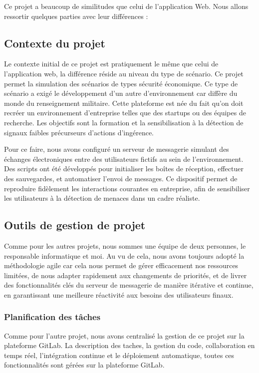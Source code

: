 Ce projet a beaucoup de similitudes que celui de l'application Web. Nous allons ressortir quelques parties avec leur différences :


\subsection{Contexte du projet}
Le contexte initial de ce projet est pratiquement le même que celui de l'application web, la différence réside au niveau du type de scénario.
Ce projet permet la simulation des scénarios de types sécurité économique.
Ce type de scénario a exigé le développement d'un autre d'environnement car diffère du monde du renseignement militaire.
Cette plateforme est née du fait qu'on doit recréer un environnement d’entreprise telles que des startups ou des équipes de recherche.
Les objectifs sont la formation et la sensibilisation à la détection de signaux faibles précurseurs d’actions d’ingérence.

Pour ce faire, nous avons configuré un serveur de messagerie simulant des échanges électroniques entre des utilisateurs fictifs au sein de l’environnement.
Des scripts ont été développés pour initialiser les boîtes de réception, effectuer des sauvegardes, et automatiser l’envoi de messages.
Ce dispositif permet de reproduire fidèlement les interactions courantes en entreprise, afin de sensibiliser les utilisateurs à la détection de menaces dans un cadre réaliste.

\subsection{Outils de gestion de projet}
Comme pour les autres projets, nous sommes une équipe de deux personnes, le responsable informatique et moi. Au vu de cela, nous avons toujours adopté la méthodologie agile car cela nous permet de gérer efficacement nos ressources limitées, de nous adapter rapidement aux changements de priorités, et de livrer des fonctionnalités clés du serveur de messagerie de manière itérative et continue, en garantissant une meilleure réactivité aux besoins des utilisateurs finaux.

\subsubsection{Planification des tâches}
Comme pour l'autre projet, nous avons centralisé la gestion de ce projet sur la plateforme GitLab.
La description des taches, la gestion du code, collaboration en temps réel, l’intégration continue et le déploiement automatique, toutes ces fonctionnalités sont gérées sur la plateforme GitLab.



